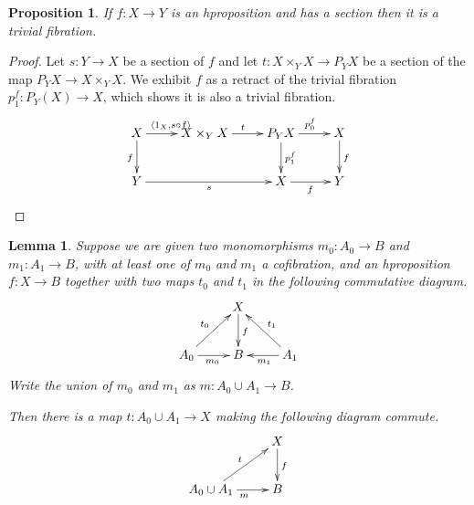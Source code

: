 \documentclass[a4paper]{amsart}
\newtheorem{proposition}[theorem]{Proposition}
\newtheorem{lemma}[theorem]{Lemma}
\theoremstyle{definition}
\begin{document}
\begin{proposition}
  \label{prop:hpropwsectistrivfib}
  If $f \colon X \to Y$ is an hproposition and has a section then it
  is a trivial fibration.
\end{proposition}

\begin{proof}
  Let $s \colon Y \to X$ be a section of $f$ and let
  $t \colon X \times_Y X \to P_Y X$ be a section of the map
  $P_Y X \to X \times_Y X$. We exhibit $f$ as a retract of the trivial
  fibration $p_1^f \colon P_Y(X) \to X$, which shows it is also a
  trivial fibration.
  \begin{equation*}
    \xymatrix{ X \ar[r]^{\langle 1_X, s \circ f \rangle} \ar[d]_f & X \times_Y
      X \ar[r]^t & P_Y X \ar[r]^{p_0^f} \ar[d]^{p_1^f} & X \ar[d]^f \\
      Y \ar[rr]_s & & X \ar[r]_f & Y}
  \end{equation*}
\end{proof}

\begin{lemma}
  \label{lem:mergeterms}
  Suppose we are given two monomorphisms $m_0 \colon A_0 \to B$ and
  $m_1 \colon A_1 \to B$, with at least one of $m_0$ and $m_1$ a
  cofibration, and an hproposition $f \colon X \to B$ together with two
  maps $t_0$ and $t_1$ in the following commutative diagram.
  \begin{equation*}
    \begin{gathered}
      \xymatrix{ & X \ar[d]^f & \\
        A_0 \ar[r]_{m_0} \ar[ur]^{t_0} & B & A_1 \ar[l]^{m_1} \ar[ul]_{t_1}}
    \end{gathered}
  \end{equation*}
  Write the union of $m_0$ and $m_1$ as $m \colon A_0 \cup A_1 \to B$.

  Then there is a map $t \colon A_0 \cup A_1 \to X$ making the
  following diagram commute.
  \begin{equation*}
    \begin{gathered}
      \xymatrix{ & X \ar[d]^f \\
        A_0 \cup A_1 \ar[r]_{m} \ar[ur]^{t} & B}      
    \end{gathered}
  \end{equation*}
\end{lemma}
\end{document}
